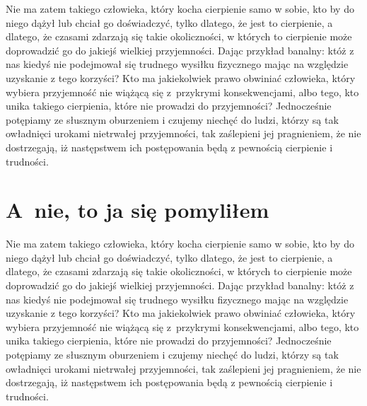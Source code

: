 \documentclass[12pt]{mwbk}
\theoremstyle{plain}
\theoremstyle{definition}
\theoremstyle{remark}
\begin{document}
Nie ma zatem takiego człowieka, który kocha cierpienie samo w sobie, 
kto by do niego dążył lub chciał go doświadczyć, tylko dlatego, że
jest to cierpienie, a dlatego, że czasami zdarzają się takie 
okoliczności, w których to cierpienie może doprowadzić 
go do jakiejś wielkiej przyjemności. 
Dając przykład banalny: któż z nas kiedyś nie podejmował 
się trudnego wysiłku fizycznego mając na względzie 
uzyskanie z tego korzyści? 
Kto ma jakiekolwiek prawo obwiniać człowieka, 
który wybiera przyjemność nie wiążącą się z~przykrymi 
konsekwencjami, albo tego, kto unika takiego cierpienia, 
które nie prowadzi do przyjemności? 
Jednocześnie potępiamy ze słusznym oburzeniem i czujemy 
niechęć do ludzi, którzy są tak owładnięci urokami nietrwałej 
przyjemności, tak zaślepieni jej pragnieniem, 
że nie dostrzegają, iż następstwem ich 
postępowania będą z pewnością cierpienie i trudności.


\section{A~nie, to ja się pomyliłem}
Nie ma zatem takiego człowieka, który kocha cierpienie samo w sobie, 
kto by do niego dążył lub chciał go doświadczyć, tylko dlatego, że
jest to cierpienie, a dlatego, że czasami zdarzają się takie 
okoliczności, w których to cierpienie może doprowadzić 
go do jakiejś wielkiej przyjemności. 
Dając przykład banalny: któż z nas kiedyś nie podejmował 
się trudnego wysiłku fizycznego mając na względzie 
uzyskanie z tego korzyści? 
Kto ma jakiekolwiek prawo obwiniać człowieka, 
który wybiera przyjemność nie wiążącą się z~przykrymi 
konsekwencjami, albo tego, kto unika takiego cierpienia, 
które nie prowadzi do przyjemności? 
Jednocześnie potępiamy ze słusznym oburzeniem i czujemy 
niechęć do ludzi, którzy są tak owładnięci urokami nietrwałej 
przyjemności, tak zaślepieni jej pragnieniem, 
że nie dostrzegają, iż następstwem ich 
postępowania będą z pewnością cierpienie i trudności.
\end{document}
